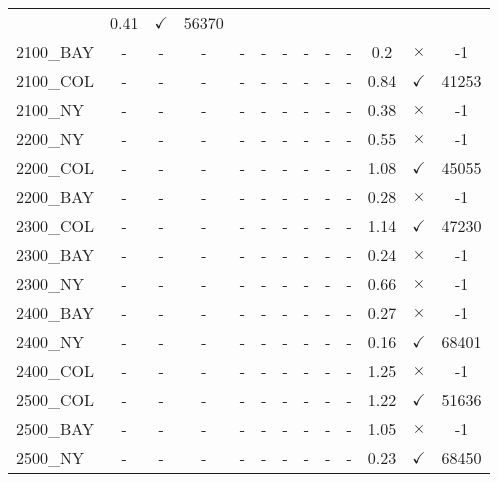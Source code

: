 \documentclass[main.tex]{subfiles}
\begin{document}
\begin{landscape}
\begin{center}
\begin{tabular}{lcccccccccccc}
 & 0.41 & $\checkmark$ & 56370\\
2100\_BAY & - & - & - 
 & - & - & - 
 & - & - & - 
 & 0.2 & $\times$ & -1\\
2100\_COL & - & - & - 
 & - & - & - 
 & - & - & - 
 & 0.84 & $\checkmark$ & 41253\\
2100\_NY & - & - & - 
 & - & - & - 
 & - & - & - 
 & 0.38 & $\times$ & -1\\
2200\_NY & - & - & - 
 & - & - & - 
 & - & - & - 
 & 0.55 & $\times$ & -1\\
2200\_COL & - & - & - 
 & - & - & - 
 & - & - & - 
 & 1.08 & $\checkmark$ & 45055\\
2200\_BAY & - & - & - 
 & - & - & - 
 & - & - & - 
 & 0.28 & $\times$ & -1\\
2300\_COL & - & - & - 
 & - & - & - 
 & - & - & - 
 & 1.14 & $\checkmark$ & 47230\\
2300\_BAY & - & - & - 
 & - & - & - 
 & - & - & - 
 & 0.24 & $\times$ & -1\\
2300\_NY & - & - & - 
 & - & - & - 
 & - & - & - 
 & 0.66 & $\times$ & -1\\
2400\_BAY & - & - & - 
 & - & - & - 
 & - & - & - 
 & 0.27 & $\times$ & -1\\
2400\_NY & - & - & - 
 & - & - & - 
 & - & - & - 
 & 0.16 & $\checkmark$ & 68401\\
2400\_COL & - & - & - 
 & - & - & - 
 & - & - & - 
 & 1.25 & $\times$ & -1\\
2500\_COL & - & - & - 
 & - & - & - 
 & - & - & - 
 & 1.22 & $\checkmark$ & 51636\\
2500\_BAY & - & - & - 
 & - & - & - 
 & - & - & - 
 & 1.05 & $\times$ & -1\\
2500\_NY & - & - & - 
 & - & - & - 
 & - & - & - 
 & 0.23 & $\checkmark$ & 68450\\
\hline\end{tabular}
\end{center}
\end{landscape}
\end{document}
